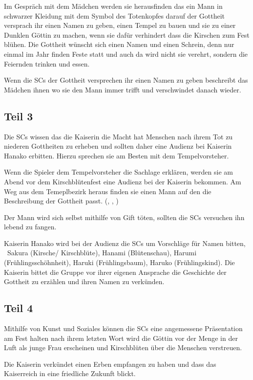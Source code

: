 {		Im Gespräch mit dem Mädchen werden sie herausfinden das ein Mann in schwarzer Kleidung mit dem Symbol des Totenkopfes darauf der Gottheit versprach ihr einen Namen zu geben, einen Tempel zu bauen und sie zu einer Dunklen Göttin zu machen, wenn sie dafür verhindert dass die Kirschen zum Fest blühen. Die Gottheit wünscht sich einen Namen und einen Schrein, denn nur einmal im Jahr finden Feste statt und auch da wird nicht sie verehrt, sondern die Feiernden trinken und essen.

		Wenn die SCs der Gottheit versprechen ihr einen Namen zu geben beschreibt das Mädchen ihnen wo sie den Mann immer trifft und verschwindet danach wieder.

		\subsection{Teil 3}

		Die SCs wissen das die Kaiserin die Macht hat Menschen nach ihrem Tot zu niederen Gottheiten zu erheben und sollten daher eine Audienz bei Kaiserin Hanako erbitten. Hierzu sprechen sie am Besten mit dem Tempelvorsteher.

		Wenn die Spieler dem Tempelvorsteher die Sachlage erklären, werden sie am Abend vor dem Kirschblütenfest eine Audienz bei der Kaiserin bekommen. Am Weg aus dem Temeplbezirk heraus finden sie einen Mann auf den die Beschreibung der Gottheit passt. (, , )

		Der Mann wird sich selbst mithilfe von Gift töten, sollten die SCs versuchen ihn lebend zu fangen.

		Kaiserin Hanako wird bei der Audienz die SCs um Vorschläge für Namen bitten, \zB\ Sakura (Kirsche/ Kirschblüte), Hanami (Blütenschau), Harumi (Frühlingsschöhnheit), Haruki (Frühlingsbaum), Haruko (Frühlingskind). Die Kaiserin bittet die Gruppe vor ihrer eigenen Ansprache die Geschichte der Gottheit zu erzählen und ihren Namen zu verkünden.

		\subsection{Teil 4}

		Mithilfe von Kunst und Soziales können die SCs eine angemessene Präsentation am Fest halten nach ihrem letzten Wort wird die Göttin vor der Menge in der Luft als junge Frau erscheinen und Kirschblüten über die Menschen verstreuen.


		\noindent
		Die Kaiserin verkündet einen Erben empfangen zu haben und dass das Kaiserreich in eine friedliche Zukunft blickt.
}
